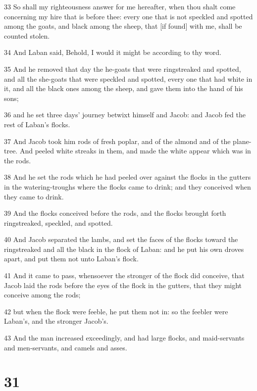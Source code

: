 \par 33 So shall my righteousness answer for me hereafter, when thou shalt come concerning my hire that is before thee: every one that is not speckled and spotted among the goats, and black among the sheep, that [if found] with me, shall be counted stolen.
\par 34 And Laban said, Behold, I would it might be according to thy word.
\par 35 And he removed that day the he-goats that were ringstreaked and spotted, and all the she-goats that were speckled and spotted, every one that had white in it, and all the black ones among the sheep, and gave them into the hand of his sons;
\par 36 and he set three days' journey betwixt himself and Jacob: and Jacob fed the rest of Laban's flocks.
\par 37 And Jacob took him rods of fresh poplar, and of the almond and of the plane-tree. And peeled white streaks in them, and made the white appear which was in the rods.
\par 38 And he set the rods which he had peeled over against the flocks in the gutters in the watering-troughs where the flocks came to drink; and they conceived when they came to drink.
\par 39 And the flocks conceived before the rods, and the flocks brought forth ringstreaked, speckled, and spotted.
\par 40 And Jacob separated the lambs, and set the faces of the flocks toward the ringstreaked and all the black in the flock of Laban: and he put his own droves apart, and put them not unto Laban's flock.
\par 41 And it came to pass, whensoever the stronger of the flock did conceive, that Jacob laid the rods before the eyes of the flock in the gutters, that they might conceive among the rods;
\par 42 but when the flock were feeble, he put them not in: so the feebler were Laban's, and the stronger Jacob's.
\par 43 And the man increased exceedingly, and had large flocks, and maid-servants and men-servants, and camels and asses.

\chapter{31}

